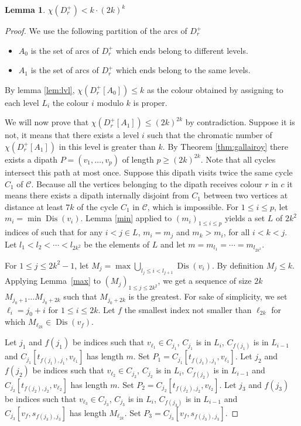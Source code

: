 \documentclass[utf8,10pt]{article}
\theoremstyle{plain}
\newtheorem{lemma}[theorem]{Lemma}
\theoremstyle{definition}
\theoremstyle{remark}
\newcommand{\dr}{ k \cdot (2k)^k}
\DeclareMathOperator{\Dis}{Dis}
\begin{document}
\begin{lemma}
$\chi(D_r^+) < \dr$
\end{lemma}

\begin{proof}
We use the following partition of the arcs of $D_r^+$

\begin{itemize}
	\item $A_0$ is the set of arcs of $D_r^+$ which ends belong to different levels.
	\item $A_1$ is the set of arcs of $D_r^+$ which ends belong to the same levels.
\end{itemize} 

By lemma \ref{lem:lvl}, $\chi(D_r^+[A_0]) \leq k$ as the colour obtained by assigning to each level $L_i$ the colour $i$ modulo $k$ is proper. 

We will now prove that $\chi(D_r^+[A_1]) \leq (2k)^{2k}$ by contradiction. 
Suppose it is not, it means that there exists a level $i$ such that the chromatic number of $\chi(D_r^+[A_1])$ in this level is greater 
than $k$. By Theorem \ref{thm:gallairoy} there exists a dipath $P=(v_1,  \dots , v_{p})$ of length $p\geq (2k)^{2k}$.
Note that all cycles intersect this path at most once.
Suppose this dipath visits twice 
the same cycle $C_1$ of $\mathcal{C}$. Because all the vertices belonging to the dipath receives colour $r$ in $c$ it means there exists a 
dipath internally disjoint from $C_1$ between two vertices at distance at least $7k$ of the cycle $C_1$ in $\mathcal{C}$, which is impossible. 
For $1\leq i\leq p$, let $m_i = \min \Dis(v_i)$. 
Lemma \ref{min} applied to $(m_i)_{1\leq i\leq p}$ yields a set $L$ of $2k^2$ indices of such that 
for any $i< j \in L$,  $m_i=m_j$ and $m_k > m_i$, for all $i< k < j$.
Let $l_1 < l_2 < \cdots < l_{2k^2}$ be the elements of $L$ and let $m= m_{l_1} = \cdots = m_{l_{2k^2}}$.


For $1\leq j\leq 2k^2-1$, let $M_j = \max \bigcup_{l_j\leq i < l_{j+1}} \Dis(v_i)$.
By definition $M_j\leq k$.
Applying Lemma~\ref{max} to $(M_j)_{1\leq j\leq 2k^2}$,  we get a sequence of size $2k$ $M_{j_0+1} \dots M_{j_0+{2k}}$ such that $M_{j_0+{2k}}$ is the greatest. 
For sake of simplicity, we set $\ell_i =j_0+i$ for $1\leq i\leq 2k$.
Let $f$ the smallest index not smaller than $\ell_{2k}$ for which $M_{\ell_{2k}} \in \Dis (v_f)$. 

Let $j_1$ and $f(j_1)$ be indices such that $v_{\ell_1} \in C_{j_1}$, $C_{j_1}$ is in $L_i$, $C_{f(j_1)}$ is in $L_{i-1}$ and 
$C_{j_1}[t_{f(j_1),j_1},v_{\ell_1}]$ has length $m$. Set $P_1=C_{j_1}[t_{f(j_1),j_1},v_{\ell_1}]$.
Let $j_2$ and $f(j_2)$ be indices such that $v_{\ell_2} \in C_{j_2}$, $C_{j_2}$ is in $L_i$, $C_{f(j_2)}$ is in $L_{i-1}$ and 
$C_{j_2}[t_{f(j_2),j_2},v_{\ell_2}]$ has length $m$. Set $P_2=C_{j_2}[t_{f(j_2),j_2},v_{\ell_2}]$.
Let $j_3$ and $f(j_3)$ be indices such that $v_{\ell_3} \in C_{j_3}$, $C_{j_3}$ is in $L_i$, $C_{f(j_3)}$ is in $L_{i-1}$ and 
$C_{j_3}[v_{f},s_{f(j_3),j_3}]$ has length $M_{\ell_{2k}}$. Set $P_3=C_{j_3}[v_{f},s_{f(j_3),j_3}]$.


\end{proof}
\end{document}
